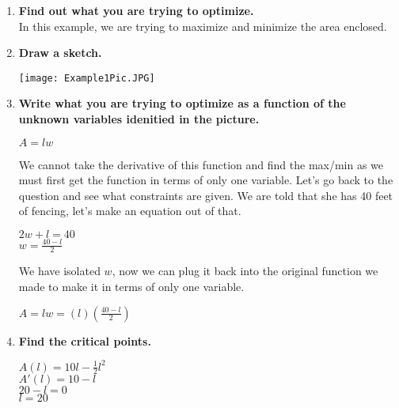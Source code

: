 \documentclass[12pt,fleqn]{book} %
\begin{document}
\begin{enumerate}
    \item \large{\textbf{Find out what you are trying to optimize.}} \\
          \normalsize{In this example, we are trying to maximize and minimize the area enclosed.}
    \item \large{\textbf{Draw a sketch.}} \\
          \begin{center}
              \texttt{[image: Example1Pic.JPG]}
          \end{center}
    \item \large{\textbf{Write what you are trying to optimize as a function of the unknown variables idenitied in the picture.}} \\
          \begin{center}
              $A=lw$ \\
          \end{center}
          \normalsize{We cannot take the derivative of this function and find the max/min as we must first get the function in terms of only one variable. Let's go back to the question and see
              what constraints are given. We are told that she has 40 feet of fencing, let's make an equation out of that.} \\
          \begin{center}
              $2w+l=40$ \\
              $w=\frac{40-l}{2}$ \\
          \end{center}
          \normalsize{We have isolated $w$, now we can plug it back into the original function we made to make it in terms of only one variable.} \\
          \begin{center}
              $A=lw=(l)(\frac{40-l}{2})$ \\
          \end{center}
    \item \large{\textbf{Find the critical points.}} \\
          \begin{center}
              $A(l)=10l-\frac{1}{2}l^2$ \\
              $A'(l)=10-l$ \\
              $20-l=0$ \\
              $l=20$ \\
          \end{center}

\end{enumerate}
\end{document}
